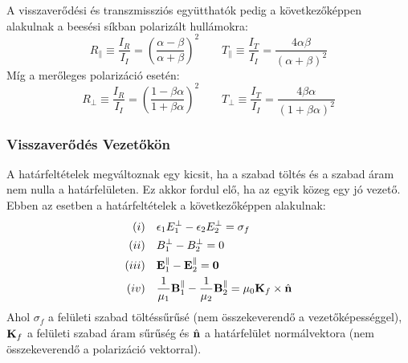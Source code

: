 \documentclass[../main.tex]{subfiles}
\begin{document}
A visszaverődési és transzmissziós együtthatók pedig a következőképpen alakulnak a beesési síkban polarizált hullámokra:
\begin{equation}
    R_\parallel \equiv \frac{I_R}{I_I} = \left( \frac{\alpha - \beta}{\alpha + \beta} \right)^2 \qquad T_\parallel \equiv \frac{I_T}{I_I} = \frac{4 \alpha \beta}{(\alpha + \beta)^2}
\end{equation}
Míg a merőleges polarizáció esetén:
\begin{equation}
    R_\perp \equiv \frac{I_R}{I_I} = \left( \frac{1 - \beta \alpha}{1 + \beta \alpha} \right)^2 \qquad T_\perp \equiv \frac{I_T}{I_I} = \frac{4 \beta \alpha}{(1 + \beta \alpha)^2}
\end{equation}

\subsubsection*{Visszaverődés Vezetőkön}
A határfeltételek megváltoznak egy kicsit, ha a szabad töltés és a szabad áram nem nulla a határfelületen. Ez akkor fordul elő, ha az egyik közeg egy jó vezető. Ebben az esetben a határfeltételek a következőképpen alakulnak:
\begin{equation}
    \begin{aligned}
        (i) \quad & \epsilon_1 E_1^{\perp} - \epsilon_2 E_2^{\perp} = \sigma_f \\
        (ii) \quad & B_1^\perp - B_2^\perp = 0 \\
        (iii) \quad & \bold{E}_1^\parallel - \bold{E}_2^\parallel = \bold{0} \\
        (iv) \quad & \frac{1}{\mu_1} \bold{B}_1^\parallel - \frac{1}{\mu_2} \bold{B}_2^\parallel = \mu_0 \bold{K}_f \times \hat{\bold{n}}
    \end{aligned}
\end{equation} 
Ahol $\sigma_f$ a felületi szabad töltéssűrűsé (nem összekeverendő a vezetőképességgel), $\bold{K}_f$ a felületi szabad áram sűrűség és $\hat{\bold{n}}$ a határfelület normálvektora (nem összekeverendő a polarizáció vektorral). 
\end{document}
